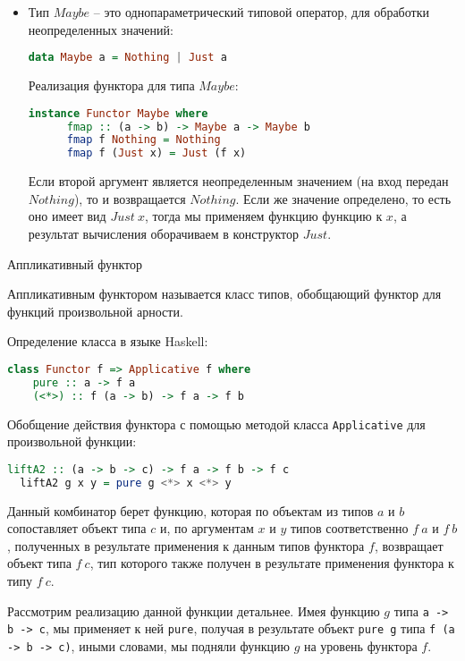 \begin{itemize}
  \item Тип $Maybe$ -- это однопараметрический типовой оператор, для обработки неопределенных значений:
  \begin{lstlisting}[language=Haskell]
    data Maybe a = Nothing | Just a
  \end{lstlisting}

  Реализация функтора для типа $Maybe$:
  \begin{lstlisting}[language=Haskell]
    instance Functor Maybe where
      fmap :: (a -> b) -> Maybe a -> Maybe b
      fmap f Nothing = Nothing
      fmap f (Just x) = Just (f x)
  \end{lstlisting}

  Если второй аргумент является неопределенным значением (на вход передан $Nothing$), то и возвращается $Nothing$. Если же значение определено, то есть оно имеет вид $Just \: x$, тогда
  мы применяем функцию функцию к $x$, а результат вычисления оборачиваем в конструктор $Just$.
\end{itemize}

\begin{defin} Аппликативный функтор

  Аппликативным функтором называется класс типов, обобщающий функтор для функций произвольной арности.
\end{defin}

Определение класса в языке Haskell:

\begin{lstlisting}[language=Haskell]
  class Functor f => Applicative f where
    pure :: a -> f a
    (<*>) :: f (a -> b) -> f a -> f b
\end{lstlisting}

Обобщение действия функтора с помощью методой класса \verb"Applicative" для произвольной функции:
\begin{lstlisting}[language=Haskell]
  liftA2 :: (a -> b -> c) -> f a -> f b -> f c
  liftA2 g x y = pure g <*> x <*> y
\end{lstlisting}

Данный комбинатор берет функцию, которая по объектам из типов $a$ и $b$ сопоставляет объект типа $c$ и,
по аргументам $x$ и $y$ типов соответственно $f \: a$ и $f \: b$, полученных в результате применения к данным типов функтора $f$,
возвращает объект типа $f \: c$, тип которого также получен в результате применения функтора к типу $f \: c$.

Рассмотрим реализацию данной функции детальнее. Имея функцию $g$ типа \verb"a -> b -> c", мы
применяет к ней \verb"pure", получая в результате объект \verb"pure g" типа \verb"f (a -> b -> c)",
иными словами, мы подняли функцию $g$ на уровень функтора $f$.


